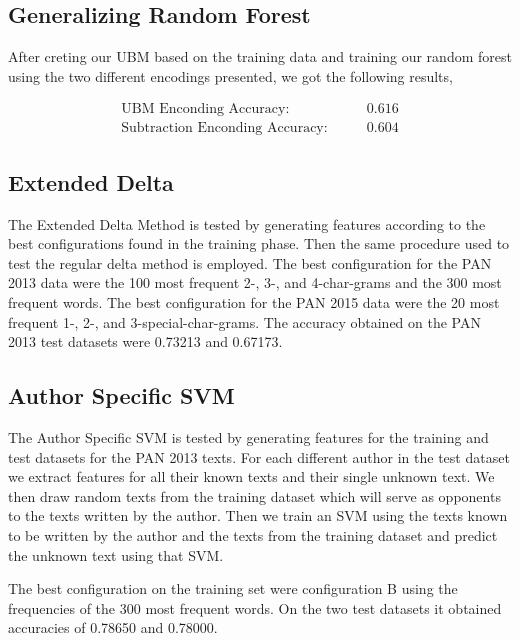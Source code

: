 \subsection{Generalizing Random Forest}
After creting our \gls{UBM} based on the training data and training our random
forest using the two different encodings presented, we got the following
results,

\begin{align}
\text{UBM Enconding Accuracy}:&\qquad 0.616\\
\text{Subtraction Enconding Accuracy}:& \qquad 0.604
\end{align}

\subsection{Extended Delta}
The Extended Delta Method is tested by generating features according to the best
configurations found in the training phase. Then the same procedure used to test
the regular delta method is employed. The best configuration for the PAN 2013
data were the 100 most frequent 2-, 3-, and 4-char-grams and the 300 most
frequent words. The best configuration for the PAN 2015 data were the 20 most
frequent 1-, 2-, and 3-special-char-grams. The accuracy obtained on the PAN 2013
test datasets were 0.73213 and 0.67173.


\subsection{Author Specific SVM}
The Author Specific SVM is tested by generating features for the training and
test datasets for the PAN 2013 texts. For each different author in the test
dataset we extract features for all their known texts and their single unknown
text. We then draw random texts from the training dataset which will serve as
opponents to the texts written by the author. Then we train an SVM using the
texts known to be written by the author and the texts from the training dataset
and predict the unknown text using that SVM.

The best configuration on the training set were configuration B using the
frequencies of the 300 most frequent words. On the two test datasets it obtained
accuracies of 0.78650 and 0.78000.

